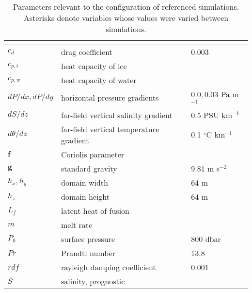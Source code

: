     \begin{table}[h!]
    \caption{Parameters relevant to the configuration of referenced simulations. Asterisks denote variables whose values were varied between simulations.}
    
    \label{table:var}
    \begin{center}
    \begin{tabular}{lll}
    \multicolumn{3}{c}{}\\
    \hline
	
	$c_d$           & drag coefficient & 0.003 \\
    $c_{p,i}$       & heat capacity of ice      & \\   
    $c_{p,w}$       & heat capacity of water    & \\   
	$dP/dx,dP/dy$   & horizontal pressure gradients & $0.0,0.03$ Pa m$^{-1}$\\
	$dS/dz$   & far-field vertical salinity gradient & 0.5 PSU km$^{-1}$\\
	$d\theta/dz$   & far-field vertical temperature gradient & 0.1 $^{\circ}$C km$^{-1}$\\
    $\textbf{f}$    & Coriolis parameter        & \\
    $\textbf{g}$    & standard gravity                  & 9.81 m s$^{-2}$ \\
	$h_x,h_y$       & domain width              & 64 m\\
	$h_z$           & domain height             & 64 m\\ 
    $L_f$           & latent heat of fusion     & \\
    $m$         & melt rate &\\
	$P_0$           & surface pressure          & 800 dbar\\
	$Pr$           & Prandtl number      & 13.8\\
	$rdf$           & rayleigh damping coefficient & 0.001\\
    $S$         & salinity, prognostic & \\ %

\end{tabular}
\end{center}
\end{table}
